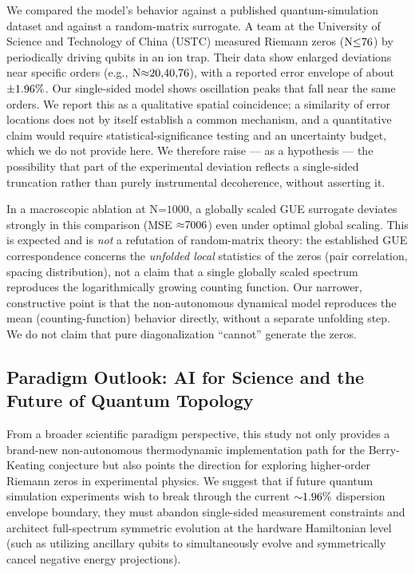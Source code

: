 \documentclass[fleqn,10pt]{wlscirep}
\begin{document}
We compared the model's behavior against a published quantum-simulation
dataset and against a random-matrix surrogate. A team at the University
of Science and Technology of China (USTC) measured Riemann zeros
(\(\text{N}\text{\ensuremath{\le}76}\)) by periodically driving qubits in an ion trap.
Their data show enlarged deviations near specific orders (e.g.,
\(\text{N}\text{\ensuremath{\approx}20,40,76}\)), with a reported error envelope of about
\(\text{\ensuremath{\pm}1.96\%}\). Our single-sided model shows oscillation peaks that
fall near the same orders. We report this as a qualitative spatial
coincidence; a similarity of error locations does not by itself
establish a common mechanism, and a quantitative claim would require
statistical-significance testing and an uncertainty budget, which we do
not provide here. We therefore raise --- as a hypothesis --- the
possibility that part of the experimental deviation reflects a
single-sided truncation rather than purely instrumental decoherence,
without asserting it.

In a macroscopic ablation at \(\text{N}\text{=1000}\), a globally scaled
GUE surrogate deviates strongly in this comparison (MSE
\(\text{\ensuremath{\approx}7006}\)) even under optimal global scaling. This is expected
and is \emph{not} a refutation of random-matrix theory: the established
GUE correspondence concerns the \emph{unfolded local} statistics of the
zeros (pair correlation, spacing distribution), not a claim that a single
globally scaled spectrum reproduces the logarithmically growing counting
function. Our narrower, constructive point is that the non-autonomous
dynamical model reproduces the mean (counting-function) behavior
directly, without a separate unfolding step. We do not claim that pure
diagonalization ``cannot'' generate the zeros.

\subsection*{Paradigm Outlook: AI for Science and the Future of Quantum Topology}

From a broader scientific paradigm perspective, this study not only
provides a brand-new non-autonomous thermodynamic implementation path
for the Berry-Keating conjecture but also points the direction for
exploring higher-order Riemann zeros in experimental physics. We suggest
that if future quantum simulation experiments wish to break through the
current \(\text{\ensuremath{\sim}1.96\%}\) dispersion envelope boundary, they must
abandon single-sided measurement constraints and architect full-spectrum
symmetric evolution at the hardware Hamiltonian level (such as utilizing
ancillary qubits to simultaneously evolve and symmetrically cancel
negative energy projections).
\end{document}
